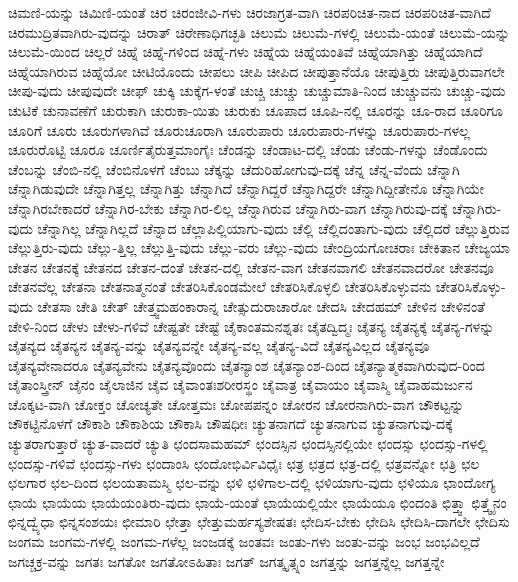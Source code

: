 {ಚಿಮಣಿ-ಯನ್ನು
ಚಿಮಿಣಿ-ಯಂತೆ
ಚಿರ
ಚಿರಂಜೀವಿ-ಗಳು
ಚಿರಜಾಗ್ರತ-ವಾಗಿ
ಚಿರಪರಿಚಿತ-ನಾದ
ಚಿರಪರಿಚಿತ-ವಾಗಿದೆ
ಚಿರಮುದ್ರಿತವಾಗಿರು-ವುದನ್ನು
ಚಿರಾತ್
ಚಿರೇಣಾಧಿಗಚ್ಛತಿ
ಚಿಲುಮೆ
ಚಿಲುಮೆ-ಗಳಲ್ಲಿ
ಚಿಲುಮೆ-ಯಂತೆ
ಚಿಲುಮೆ-ಯನ್ನು
ಚಿಲುಮೆ-ಯಿಂದ
ಚಿಲ್ಲರೆ
ಚಿಹ್ನೆ
ಚಿಹ್ನೆ-ಗಳಿಂದ
ಚಿಹ್ನೆ-ಗಳು
ಚಿಹ್ನೆಯ
ಚಿಹ್ನೆಯಂತಿವೆ
ಚಿಹ್ನೆಯಾಗಿತ್ತು
ಚಿಹ್ನೆಯಾಗಿದೆ
ಚಿಹ್ನೆಯಾಗಿರುವ
ಚಿಹ್ನೆಯೋ
ಚೀಟಿಯೊಂದು
ಚೀಪಲು
ಚೀಪಿ
ಚೀಪಿದ
ಚೀಪುತ್ತಾನೆಯೊ
ಚೀಪುತ್ತಿರು
ಚೀಪುತ್ತಿರುವಾಗಲೇ
ಚೀಪು-ವುದು
ಚೀಪುವುದೇ
ಚೀಫ್
ಚುಕ್ಕಿ
ಚುಕ್ಕೆಗ-ಳಂತೆ
ಚುಚ್ಚಿ
ಚುಚ್ಚು
ಚುಚ್ಚುಮಾತಿ-ನಿಂದ
ಚುಚ್ಚುವನು
ಚುಚ್ಚು-ವುದು
ಚುಟಿಕೆ
ಚುನಾವಣೆಗೆ
ಚುರುಕಾಗಿ
ಚುರುಕಾ-ಯಿತು
ಚುರುಕು
ಚೂಪಾದ
ಚೂಪಿ-ನಲ್ಲಿ
ಚೂರನ್ನು
ಚೂ-ರಾದ
ಚೂರಿಗೂ
ಚೂರಿಗೆ
ಚೂರು
ಚೂರುಗಳಾಗಿವೆ
ಚೂರುಚೂರಾಗಿ
ಚೂರುಪಾರು
ಚೂರುಪಾರು-ಗಳನ್ನು
ಚೂರುಪಾರು-ಗಳಲ್ಲ
ಚೂರುರೊಟ್ಟಿ
ಚೂರೂ
ಚೂರ್ಣಿತೈರುತ್ತಮಾಂಗೈಃ
ಚೆಂಡನ್ನು
ಚೆಂಡಾಟ-ದಲ್ಲಿ
ಚೆಂಡು
ಚೆಂಡು-ಗಳನ್ನು
ಚೆಂಡೊಂದು
ಚೆಂಬನ್ನು
ಚೆಂಬಿ-ನಲ್ಲಿ
ಚೆಂಬಿನೊಳಗೆ
ಚೆಂಬು
ಚೆಕ್ಕನ್ನು
ಚೆದುರಿಹೋಗುವು-ದಕ್ಕೆ
ಚೆನ್ನ
ಚೆನ್ನ-ವೆಂದು
ಚೆನ್ನಾಗಿ
ಚೆನ್ನಾಗಿಡುವುದೇ
ಚೆನ್ನಾಗಿತ್ತಲ್ಲ
ಚೆನ್ನಾಗಿತ್ತು
ಚೆನ್ನಾಗಿದೆ
ಚೆನ್ನಾಗಿದ್ದರೆ
ಚೆನ್ನಾಗಿದ್ದರೇ
ಚೆನ್ನಾಗಿದ್ದೀತೇನೊ
ಚೆನ್ನಾಗಿಯೇ
ಚೆನ್ನಾಗಿರಬೇಕಾದರೆ
ಚೆನ್ನಾಗಿರ-ಬೇಕು
ಚೆನ್ನಾಗಿರ-ಲಿಲ್ಲ
ಚೆನ್ನಾಗಿರುವ
ಚೆನ್ನಾಗಿರು-ವಾಗ
ಚೆನ್ನಾಗಿರುವು-ದಕ್ಕೆ
ಚೆನ್ನಾಗಿರು-ವುದು
ಚೆನ್ನಾಗಿಲ್ಲ
ಚೆನ್ನಾಗಿಲ್ಲದೆ
ಚೆನ್ನಾದ
ಚೆಲ್ಲಾಪಿಲ್ಲಿಯಾಗು-ವುದು
ಚೆಲ್ಲಿ
ಚೆಲ್ಲಿದಂತಾಗು-ವುದು
ಚೆಲ್ಲಿದರೆ
ಚೆಲ್ಲುತ್ತಿರುವ
ಚೆಲ್ಲುತ್ತಿರು-ವುದು
ಚೆಲ್ಲು-ತ್ತಿಲ್ಲ
ಚೆಲ್ಲುತ್ತಿ-ವುದು
ಚೆಲ್ಲು-ವರು
ಚೆಲ್ಲು-ವುದು
ಚೇಂದ್ರಿಯಗೋಚರಾಃ
ಚೇಕಿತಾನ
ಚೇಜ್ಯಯಾ
ಚೇತನ
ಚೇತನಕ್ಕೆ
ಚೇತನದ
ಚೇತನ-ದಂತೆ
ಚೇತನ-ದಲ್ಲಿ
ಚೇತನ-ವಾಗ
ಚೇತನವಾಗಲಿ
ಚೇತನವಾದರೋ
ಚೇತನವೂ
ಚೇತನವೆಲ್ಲ
ಚೇತನಾ
ಚೇತನಾತ್ಮನಂತೆ
ಚೇತರಿಸಿಕೊಂಡಮೇಲೆ
ಚೇತರಿಸಿಕೊಳ್ಳಲಿ
ಚೇತರಿಸಿಕೊಳ್ಳುವನು
ಚೇತರಿಸಿಕೊಳ್ಳು-ವುದು
ಚೇತಸಾ
ಚೇತಿ
ಚೇತ್
ಚೇತ್ತ್ವಮಹಂಕಾರಾನ್ನ
ಚೇತ್ಸುದುರಾಚಾರೋ
ಚೇದಸಿ
ಚೇದಹಮ್
ಚೇಳಿನ
ಚೇಳಿನಂತೆ
ಚೇಳಿ-ನಿಂದ
ಚೇಳು
ಚೇಳು-ಗಳಿವೆ
ಚೇಷ್ಟತೇ
ಚೇಷ್ಟೆ
ಚೈಕಾಂತಮನಶ್ನತಃ
ಚೈತದ್ವಿದ್ಮಃ
ಚೈತನ್ಯ
ಚೈತನ್ಯಕ್ಕೆ
ಚೈತನ್ಯ-ಗಳನ್ನು
ಚೈತನ್ಯದ
ಚೈತನ್ಯನ
ಚೈತನ್ಯ-ವನ್ನು
ಚೈತನ್ಯವನ್ನೇ
ಚೈತನ್ಯ-ವಲ್ಲ
ಚೈತನ್ಯ-ವಿದೆ
ಚೈತನ್ಯವಿಲ್ಲದ
ಚೈತನ್ಯವೂ
ಚೈತನ್ಯವೇನಾದರೂ
ಚೈತನ್ಯವೇನು
ಚೈತನ್ಯವೊಂದು
ಚೈತನ್ಯಾಂಶ
ಚೈತನ್ಯಾಂಶ-ದಿಂದ
ಚೈತನ್ಯಾತ್ಮಕವಾಗಿರುವುದ-ರಿಂದ
ಚೈತಾಂಸ್ತ್ರೀನ್
ಚೈನಂ
ಚೈಲಾಜಿನ
ಚೈವ
ಚೈವಾಂತಃಶರೀರಸ್ಥಂ
ಚೈವಾತ್ರ
ಚೈವಾಯಂ
ಚೈವಾಸ್ಮಿ
ಚೈವಾಹಮರ್ಜುನ
ಚೊಕ್ಕಟ-ವಾಗಿ
ಚೋಕ್ತಂ
ಚೋಚ್ಯತೇ
ಚೋತ್ತಮಃ
ಚೋಪಪನ್ನಂ
ಚೋರನ
ಚೋರನಾಗಿರು-ವಾಗ
ಚೌಕಟ್ಟನ್ನು
ಚೌಕಟ್ಟಿನೊಳಗೆ
ಚೌಕಾಶಿ
ಚೌಕಾಶಿಯ
ಚೌಕಾಸಿ
ಚೌಷಧೀಃ
ಚ್ಯುತನಾಗದೆ
ಚ್ಯುತನಾಗುವ
ಚ್ಯುತನಾಗುವು-ದಕ್ಕೆ
ಚ್ಯುತರಾಗುತ್ತಾರೆ
ಚ್ಯುತ-ವಾದರೆ
ಚ್ಯುತಿ
ಛಂದಸಾಮಹಮ್
ಛಂದಸ್ಸಿನ
ಛಂದಸ್ಸಿನಲ್ಲಿಯೇ
ಛಂದಸ್ಸು
ಛಂದಸ್ಸು-ಗಳಲ್ಲಿ
ಛಂದಸ್ಸು-ಗಳಿವೆ
ಛಂದಸ್ಸು-ಗಳು
ಛಂದಾಂಸಿ
ಛಂದೋಭಿರ್ವಿವಿಧೈಃ
ಛತ್ರ
ಛತ್ರದ
ಛತ್ರ-ದಲ್ಲಿ
ಛತ್ರವನ್ನೋ
ಛತ್ರಿ
ಛಲ
ಛಲಗಾರ
ಛಲ-ದಿಂದ
ಛಲಯತಾಮಸ್ಮಿ
ಛಲ-ವನ್ನು
ಛಳಿ
ಛಳಿಗಾಲ-ದಲ್ಲಿ
ಛಳಿಯಾಗು-ವುದು
ಛಳಿಯೂ
ಛಾಂದೋಗ್ಯ
ಛಾಯೆ
ಛಾಯೆಯ
ಛಾಯೆಯಂತಿರು-ವುದು
ಛಾಯೆ-ಯಂತೆ
ಛಾಯೆಯಲ್ಲಿಯೇ
ಛಾಯೆಯೂ
ಛಿಂದಂತಿ
ಛಿತ್ತ್ವಾ
ಛಿತ್ತ್ವೈನಂ
ಛಿನ್ನದ್ವ್ಯೆಧಾ
ಛಿನ್ನಸಂಶಯಃ
ಛೀಮಾರಿ
ಛೇತ್ತಾ
ಛೇತ್ತುಮರ್ಹಸ್ಯಶೇಷತಃ
ಛೇದಿಸ-ಬೇಕು
ಛೇದಿಸಿ
ಛೇದಿಸಿ-ದಾಗಲೇ
ಛೇದಿಸು
ಜಂಗಮ
ಜಂಗಮ-ಗಳಲ್ಲಿ
ಜಂಗಮ-ಗಳೆಲ್ಲ
ಜಂಜಡಕ್ಕೆ
ಜಂತವಃ
ಜಂತು-ಗಳು
ಜಂತು-ವನ್ನು
ಜಂಭ
ಜಂಭವಿಲ್ಲದೆ
ಜಗಚ್ಚಕ್ರ-ವನ್ನು
ಜಗತಃ
ಜಗತೋ
ಜಗತೋಽಹಿತಾಃ
ಜಗತ್
ಜಗತ್ಕೃತ್ಸ್ನಂ
ಜಗತ್ತನ್ನು
ಜಗತ್ತನ್ನೆಲ್ಲ
ಜಗತ್ತನ್ನೇ
}
